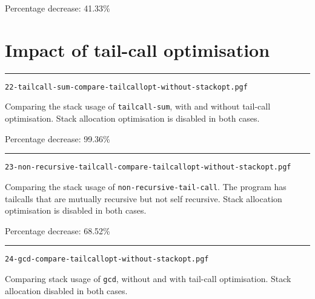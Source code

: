 \documentclass{article}
\newcommand{\plot}[1]{
\rule{\textwidth}{1pt}
\texttt{#1}

\fbox{\resizebox{\textwidth}{!}{}}
}
\begin{document}
Percentage decrease: 41.33\%



\newpage
\section{Impact of tail-call optimisation}

\plot{22-tailcall-sum-compare-tailcallopt-without-stackopt.pgf}

Comparing the stack usage of \texttt{tailcall-sum}, with and without tail-call optimisation. Stack allocation optimisation is disabled in both cases.

Percentage decrease: 99.36\%

\plot{23-non-recursive-tailcall-compare-tailcallopt-without-stackopt.pgf}

Comparing the stack usage of \texttt{non-recursive-tail-call}.
The program has tailcalls that are mutually recursive but not self recursive.
Stack allocation optimisation is disabled in both cases.

Percentage decrease: 68.52\%

\plot{24-gcd-compare-tailcallopt-without-stackopt.pgf}

Comparing stack usage of \texttt{gcd}, without and with tail-call optimisation. Stack allocation disabled in both cases.
\end{document}
